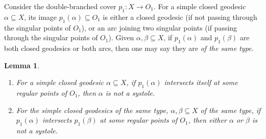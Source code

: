\documentclass[UTF8]{amsart}
\newtheorem{lemma}[theorem]{Lemma}
\numberwithin{equation}{section}
\theoremstyle{definition}
\theoremstyle{example}
\theoremstyle{remark}
\begin{document}
Consider the double-branched cover $p_1:X \to O_1$. 
For a simple closed geodesic $\alpha \subseteq X$, its image $p_1(\alpha) \subseteq O_1$ is either a closed geodesic (if not passing through the singular points of $O_1$), or an arc joining two singular points (if passing through the singular points of $O_1$). 
Given $\alpha, \beta \subseteq X$, if $p_1(\alpha)$ and $p_1(\beta)$ are both closed geodesics or both arcs, then one may say they are \emph{of the same type}. 
\begin{lemma}
 \begin{enumerate}
  \item For a simple closed geodesic $\alpha \subseteq X$, if $p_1(\alpha)$ intersects itself at some regular points of $O_1$, then $\alpha$ is not a systole. 
\item For the simple closed geodesics of the same type, $\alpha, \beta \subseteq X$ of the same type, if $p_1(\alpha)$ intersects $p_1(\beta)$ at some regular points of $O_1$, then either $\alpha$ or $\beta$ is not a systole. 
 \end{enumerate}
 \label{lem:intersect}
\end{lemma}
\end{document}
